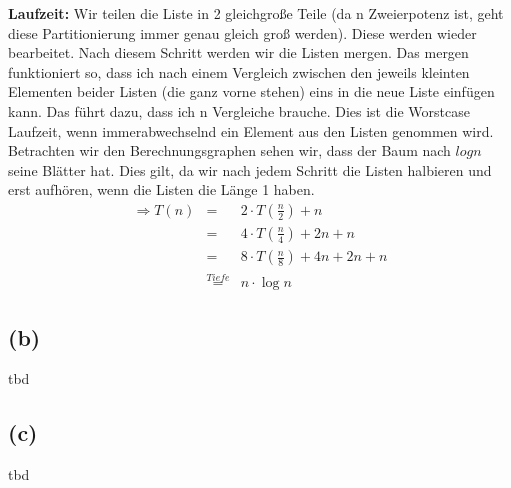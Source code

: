 \documentclass[11pt,a4paper,ngerman]{article}
\begin{document}
\begin{description}
\begin{description}
\item{\bfseries Laufzeit:} Wir teilen die Liste in 2 gleichgroße Teile (da n Zweierpotenz ist, geht diese Partitionierung immer genau gleich groß werden). Diese werden wieder bearbeitet. Nach diesem Schritt werden wir die Listen mergen. Das mergen funktioniert so, dass ich nach einem Vergleich zwischen den jeweils kleinten Elementen beider Listen (die ganz vorne stehen) eins in die neue Liste einfügen kann. Das führt dazu, dass ich n Vergleiche brauche. Dies ist die Worstcase Laufzeit, wenn immerabwechselnd ein Element aus den Listen genommen wird.\\
Betrachten wir den Berechnungsgraphen sehen wir, dass der Baum nach $log n$ seine Blätter hat. Dies gilt, da wir nach jedem Schritt die Listen halbieren und erst aufhören, wenn die Listen die Länge 1 haben. 
$$
\begin{array}{rcl}
\Rightarrow T(n) &=& 2 \cdot T(\frac{n}{2}) + n  \\
&=& 4\cdot T(\frac{n}{4}) + 2n + n\\  &=& 8\cdot T(\frac{n}{8}) +4n +2n + n\\
&\stackrel{Tiefe}{=}& n \cdot \log n 
\end{array}
$$

\end{description}

\end{description}

\subsection*{(b)}

tbd

\subsection*{(c)}

tbd

\label{LastPage}
\end{document}
